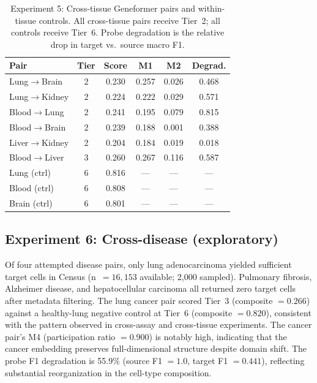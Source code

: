 \documentclass[11pt,letterpaper]{article}
\begin{document}
\begin{table}[t]
\centering
\caption{Experiment 5: Cross-tissue Geneformer pairs and within-tissue controls. All cross-tissue pairs receive Tier~2; all controls receive Tier~6. Probe degradation is the relative drop in target vs.\ source macro F1.}
\label{tab:exp5}
\small
\begin{tabular}{@{}lccccc@{}}
\toprule
Pair & Tier & Score & M1 & M2 & Degrad. \\
\midrule
Lung$\to$Brain       & 2 & 0.230 & 0.257 & 0.026 & 0.468 \\
Lung$\to$Kidney      & 2 & 0.224 & 0.222 & 0.029 & 0.571 \\
Blood$\to$Lung       & 2 & 0.241 & 0.195 & 0.079 & 0.815 \\
Blood$\to$Brain      & 2 & 0.239 & 0.188 & 0.001 & 0.388 \\
Liver$\to$Kidney     & 2 & 0.204 & 0.184 & 0.019 & 0.018 \\
Blood$\to$Liver      & 3 & 0.260 & 0.267 & 0.116 & 0.587 \\
\midrule
Lung (ctrl)          & 6 & 0.816 & --- & --- & --- \\
Blood (ctrl)         & 6 & 0.808 & --- & --- & --- \\
Brain (ctrl)         & 6 & 0.801 & --- & --- & --- \\
\bottomrule
\end{tabular}
\end{table}

\subsection{Experiment 6: Cross-disease (exploratory)}

Of four attempted disease pairs, only lung adenocarcinoma yielded sufficient target cells in Census (n~$= 16{,}153$ available; 2,000 sampled). Pulmonary fibrosis, Alzheimer disease, and hepatocellular carcinoma all returned zero target cells after metadata filtering. The lung cancer pair scored Tier~3 (composite $= 0.266$) against a healthy-lung negative control at Tier~6 (composite $= 0.820$), consistent with the pattern observed in cross-assay and cross-tissue experiments. The cancer pair's M4 (participation ratio $= 0.900$) is notably high, indicating that the cancer embedding preserves full-dimensional structure despite domain shift. The probe F1 degradation is 55.9\% (source F1 $= 1.0$, target F1 $= 0.441$), reflecting substantial reorganization in the cell-type composition.
\end{document}
